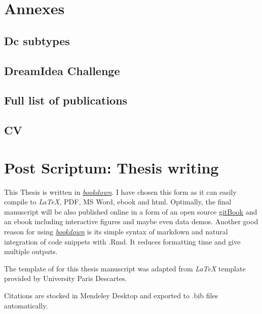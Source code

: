 \documentclass[12pt,]{book}
\theoremstyle{definition}
\theoremstyle{definition}
\theoremstyle{definition}
\theoremstyle{remark}
\begin{document}
\hypertarget{annexes}{%
\chapter*{Annexes}\label{annexes}}

\hypertarget{dc-subtypes}{%
\section*{Dc subtypes}\label{dc-subtypes}}

\hypertarget{dreamidea-challenge}{%
\section*{DreamIdea Challenge}\label{dreamidea-challenge}}

\hypertarget{full-list-of-publications}{%
\section*{Full list of publications}\label{full-list-of-publications}}

\hypertarget{cv}{%
\section*{CV}\label{cv}}

\newpage

\hypertarget{post-scriptum-thesis-writing}{%
\chapter*{Post Scriptum: Thesis
writing}\label{post-scriptum-thesis-writing}}

This Thesis is written in
\href{https://github.com/rstudio/bookdown}{\emph{bookdown}}. I have
chosen this form as it can easily compile to \emph{LaTeX}, PDF, MS Word,
ebook and html. Optimally, the final manuscript will be also published
online in a form of an open source
\href{https://www.gitbook.com/about}{gitBook} and an ebook including
interactive figures and maybe even data demos. Another good reason for
using \href{https://github.com/rstudio/bookdown}{\emph{bookdown}} is its
simple syntax of markdown and natural integration of code snippets with
.Rmd. It reduces formatting time and give multiple outputs.

The template of for this thesis manuscript was adapted from \emph{LaTeX}
template provided by University Paris Descartes.

Citations are stocked in Mendeley Desktop and exported to .bib files
automatically.



\end{document}
